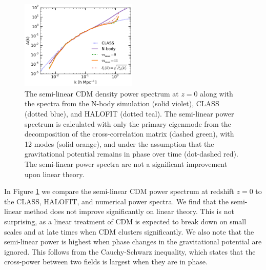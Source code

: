 \documentclass[twocolumn,superscriptaddress,prd]{revtex4}
\newcommand{\halofit}{HALOFIT }
\newcommand{\halofitns}{HALOFIT}
\begin{document}
\begin{figure}[h!]
  \centering
    \includegraphics[width=0.495\textwidth]{Figures/density_cdm_0.pdf}
    \caption{The semi-linear CDM density power spectrum at $z=0$ along with the
      spectra from the N-body simulation (solid
      violet),
      CLASS (dotted blue), and \halofit (dotted teal).  
The semi-linear power spectrum is calculated with only the primary
eigenmode from the decomposition of the cross-correlation matrix
(dashed green), with 12 modes (solid orange), and under the assumption
that the gravitational potential remains in phase over time
(dot-dashed red).
      The semi-linear power spectra are not a significant improvement
      upon linear theory.  
}
    \label{fig:delta_cdm_rec}
\end{figure}

In Figure \ref{fig:delta_cdm_rec} we compare the semi-linear CDM
 power spectrum at redshift $z=0$ to the CLASS, \halofitns, and
numerical power spectra. We find that the semi-linear method does not improve
significantly on linear theory.  This is not surprising, as a linear
treatment of CDM is expected to break down on small scales and
at late times when CDM clusters significantly.  
We also note that the semi-linear power is highest when phase changes 
in the gravitational potential are ignored.  
This follows from the Cauchy-Schwarz inequality, which
states that the cross-power between two fields is largest when they
are in phase.
\end{document}
